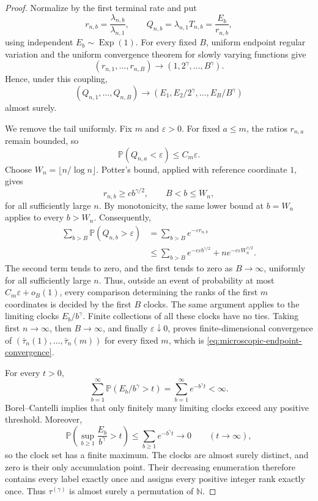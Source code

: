 \documentclass[11pt]{article}
\theoremstyle{remark}
\newcommand{\Pp}{\mathbb P}
\newcommand{\Exp}{\operatorname{Exp}}
\begin{document}
\begin{proof}
Normalize by the first terminal rate and put
\[
        r_{n,b}=\frac{\lambda_{n,b}}{\lambda_{n,1}},
        \qquad
        Q_{n,b}=\lambda_{n,1}T_{n,b}=\frac{E_b}{r_{n,b}},
\]
using independent \(E_b\sim\Exp(1)\).  For every fixed \(B\), uniform
endpoint regular variation and the uniform convergence theorem for slowly
varying functions give
\[
        (r_{n,1},\ldots,r_{n,B})
        \longrightarrow(1,2^\gamma,\ldots,B^\gamma).
\]
Hence, under this coupling,
\[
        (Q_{n,1},\ldots,Q_{n,B})
        \longrightarrow
        (E_1,E_2/2^\gamma,\ldots,E_B/B^\gamma)
\]
almost surely.

We remove the tail uniformly.  Fix \(m\) and \(\varepsilon>0\).  For fixed
\(a\le m\), the ratios \(r_{n,a}\) remain bounded, so
\[
        \Pp(Q_{n,a}<\varepsilon)\le C_m\varepsilon.
\]
Choose \(W_n=\lfloor n/\log n\rfloor\).  Potter's bound, applied with
reference coordinate \(1\), gives
\[
        r_{n,b}\ge cb^{\gamma/2},
        \qquad B<b\le W_n,
\]
for all sufficiently large \(n\).  By monotonicity, the same lower bound at
\(b=W_n\) applies to every \(b>W_n\).  Consequently,
\[
\begin{aligned}
        \sum_{b>B}\Pp(Q_{n,b}>\varepsilon)
        &=\sum_{b>B}e^{-\varepsilon r_{n,b}}\\
        &\le\sum_{b>B}e^{-c\varepsilon b^{\gamma/2}}
        +n e^{-c\varepsilon W_n^{\gamma/2}}.
\end{aligned}
\tag{8.54}\label{eq:microscopic-tail-truncation}
\]
The second term tends to zero, and the first tends to zero as \(B\to\infty\),
uniformly for all sufficiently large \(n\).  Thus, outside an event of
probability at most \(C_m\varepsilon+o_B(1)\), every comparison determining
the ranks of the first \(m\) coordinates is decided by the first \(B\) clocks.
The same argument applies to the limiting clocks \(E_b/b^\gamma\).  Finite
collections of all these clocks have no ties.  Taking first \(n\to\infty\),
then \(B\to\infty\), and finally \(\varepsilon\downarrow0\), proves
finite-dimensional convergence of
\((\bar\tau_n(1),\ldots,\bar\tau_n(m))\) for every fixed \(m\), which is
\eqref{eq:microscopic-endpoint-convergence}.

For every \(t>0\),
\[
        \sum_{b=1}^\infty
        \Pp(E_b/b^\gamma>t)
        =\sum_{b=1}^\infty e^{-b^\gamma t}<\infty.
\]
Borel--Cantelli implies that only finitely many limiting clocks exceed any
positive threshold.  Moreover,
\[
        \Pp\left(\sup_{b\ge1}\frac{E_b}{b^\gamma}>t\right)
        \le\sum_{b\ge1}e^{-b^\gamma t}\longrightarrow0
        \qquad(t\to\infty),
\]
so the clock set has a finite maximum.  The clocks are almost surely distinct,
and zero is their only accumulation point.  Their decreasing enumeration
therefore contains every label exactly once and assigns every positive integer
rank exactly once.  Thus \(\tau^{(\gamma)}\) is almost surely a permutation of
\(\mathbb N\).
\end{proof}
\end{document}
